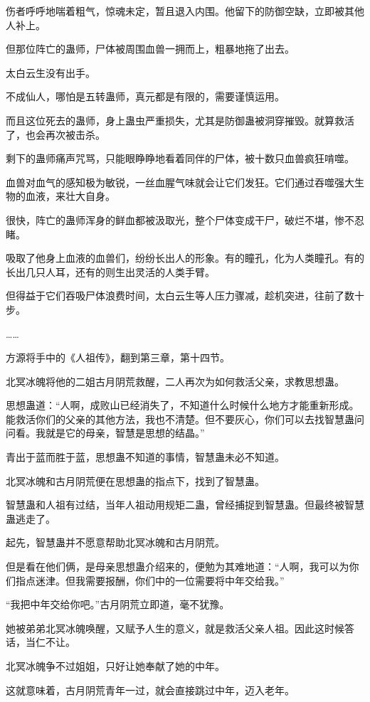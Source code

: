 \begin{this_body}
伤者呼呼地喘着粗气，惊魂未定，暂且退入内围。他留下的防御空缺，立即被其他人补上。

但那位阵亡的蛊师，尸体被周围血兽一拥而上，粗暴地拖了出去。

太白云生没有出手。

不成仙人，哪怕是五转蛊师，真元都是有限的，需要谨慎运用。

而且这位死去的蛊师，身上蛊虫严重损失，尤其是防御蛊被洞穿摧毁。就算救活了，也会再次被击杀。

剩下的蛊师痛声咒骂，只能眼睁睁地看着同伴的尸体，被十数只血兽疯狂啃噬。

血兽对血气的感知极为敏锐，一丝血腥气味就会让它们发狂。它们通过吞噬强大生物的血液，来壮大自身。

很快，阵亡的蛊师浑身的鲜血都被汲取光，整个尸体变成干尸，破烂不堪，惨不忍睹。

吸取了他身上血液的血兽们，纷纷长出人的形象。有的瞳孔，化为人类瞳孔。有的长出几只人耳，还有的则生出灵活的人类手臂。

但得益于它们吞吸尸体浪费时间，太白云生等人压力骤减，趁机突进，往前了数十步。

……

方源将手中的《人祖传》，翻到第三章，第十四节。

北冥冰魄将他的二姐古月阴荒救醒，二人再次为如何救活父亲，求教思想蛊。

思想蛊道：“人啊，成败山已经消失了，不知道什么时候什么地方才能重新形成。能救活你们的父亲的其他方法，我也不清楚。但不要灰心，你们可以去找智慧蛊问问看。我就是它的母亲，智慧是思想的结晶。”

青出于蓝而胜于蓝，思想蛊不知道的事情，智慧蛊未必不知道。

北冥冰魄和古月阴荒便在思想蛊的指点下，找到了智慧蛊。

智慧蛊和人祖有过结，当年人祖动用规矩二蛊，曾经捕捉到智慧蛊。但最终被智慧蛊逃走了。

起先，智慧蛊并不愿意帮助北冥冰魄和古月阴荒。

但是看在他们俩，是母亲思想蛊介绍来的，便勉为其难地道：“人啊，我可以为你们指点迷津。但我需要报酬，你们中的一位需要将中年交给我。”

“我把中年交给你吧。”古月阴荒立即道，毫不犹豫。

她被弟弟北冥冰魄唤醒，又赋予人生的意义，就是救活父亲人祖。因此这时候答话，当仁不让。

北冥冰魄争不过姐姐，只好让她奉献了她的中年。

这就意味着，古月阴荒青年一过，就会直接跳过中年，迈入老年。


\end{this_body}
